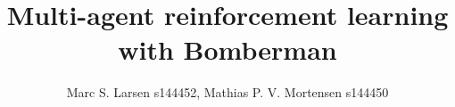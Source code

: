 

\setcounter{secnumdepth}{0}

\title{Multi-agent reinforcement learning with Bomberman} 
\author{Marc S. Larsen s144452, Mathias P. V. Mortensen s144450}
\date{\vspace{-5ex}}



\maketitle



